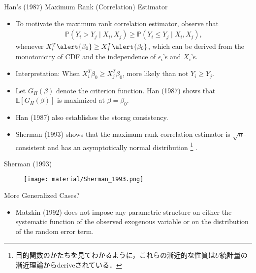 \documentclass[xcolor=svgnames,dvipdfmx,cjk]{beamer}
\theoremstyle{example}
\def\E{\mathbb{E}}
\def\P{\mathbb{P}}
\begin{document}
\begin{frame}{Han's (1987) Maximum Rank (Correlation) Estimator}
\begin{itemize}
    \item To motivate the maximum rank correlation estimator, observe that
          \begin{align*}
            \P(Y_i > Y_j \mid X_i, X_j) \geq \P(Y_i \leq Y_j \mid X_i, X_j),
          \end{align*}
          whenever $X_i^T\alert{\beta_0} \geq X_j^T\alert{\beta_0}$,
          which can be derived from the monotonicity of CDF 
          and the independence of $\epsilon_i$'s and $X_i$'s.
    \item \alert{Interpretation}: 
          When $X_i^T\beta_0 \geq X_j^T\beta_0$, more likely than not $Y_i \geq Y_j$.
    \item Let $G_H(\beta)$ denote the criterion function. 
          Han (1987) shows that $\E[G_H(\beta)]$ is maximized at $\beta = \beta_0$.
    \item Han (1987) also establishes the storng consistency.
    \item Sherman (1993) shows that 
          the maximum rank correlation estimator is $\sqrt{n}$-consistent
          and has an asymptotically normal distribution
          \footnote{目的関数のかたちを見てわかるように，これらの漸近的な性質は$U$統計量の漸近理論からderiveされている．}
          .
\end{itemize}
\end{frame}  

\begin{frame}{Sherman (1993)}
  \begin{figure}
    \begin{center}
      \texttt{[image: material/Sherman\_1993.png]}
    \end{center}
  \end{figure}
\end{frame}

\begin{frame}{More Generalized Cases?}
\begin{itemize}
  \item Matzkin (1992) does not impose any parametric structure on 
        either the systematic function of the observed exogenous variable
        or on the distribution of the random error term.
\end{itemize}
\end{frame}

  
\end{document}
